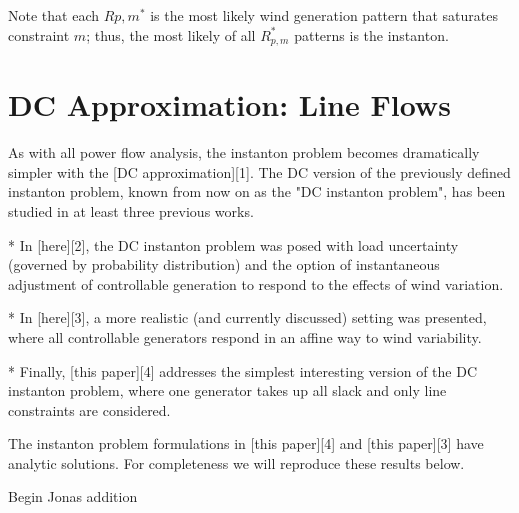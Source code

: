 Note that each $R{p,m}^*$ is the most likely wind generation pattern that saturates constraint $m$; thus, the most likely of all $R_{p,m}^*$ patterns is the instanton.

\section{DC Approximation: Line Flows}

As with all power flow analysis, the instanton problem becomes dramatically simpler with the [DC approximation][1]. The DC version of the previously defined instanton problem, known from now on as the "DC instanton problem", has been studied in at least three previous works.

* In [here][2], the DC instanton problem was posed with load uncertainty (governed by probability distribution) and the option of instantaneous adjustment of controllable generation to respond to the effects of wind variation.

* In [here][3], a more realistic (and currently discussed) setting was presented, where all controllable generators respond in an affine way to wind variability. 

* Finally, [this paper][4] addresses the simplest interesting version of the DC instanton problem, where one generator takes up all slack and only line constraints are considered. 

The instanton problem formulations in [this paper][4] and [this paper][3] have analytic solutions. For completeness we will reproduce these results below.

{\color{red} Begin Jonas addition}

